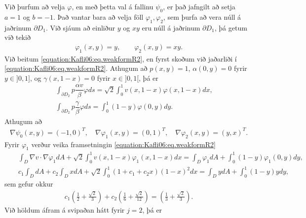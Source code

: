 \documentclass[a4paper,10pt,icelandic]{sphinxmanual}
\begin{document}
Við þurfum að velja \(\varphi\), en með þetta val á fallinu \(\psi_0\), er það jafngilt að setja \(a=1\) og \(b=-1\). Það vantar bara að velja föll \(\varphi_1, \varphi_2\), sem þurfa að vera núll á jaðrinum \(\partial D_1\).
Við sjáum að einliður \(y\) og \(x y\) eru núll á jaðrinum \(\partial D_1\), þá getum við tekið
\begin{equation*}
\begin{split}\varphi_1 (x,y)=y , \qquad \varphi_2(x,y)= x y.\end{split}
\end{equation*}
Við beitum \eqref{equation:Kafli06:eq.weakformR2}, en fyrst skoðum við jaðarliði í \eqref{equation:Kafli06:eq.weakformR2}.
Athugum að \(p(x,y)=1\),  \(\alpha(0,y)=0\) fyrir \(y\in ]0,1]\), og \(\gamma(x,1-x)=0\) fyrir \(x\in ]0,1[\), þá er
\begin{equation*}
\begin{split}&& \int_{\partial D_2} p \dfrac{\alpha v}{\beta} \varphi ds=
\sqrt 2 \int_0^1 v(x,1-x) \varphi(x,1-x)dx, \\
&& \int_{\partial D_2} p \dfrac{\gamma}{\beta} \varphi ds= \int_0^1 (1-y)\varphi(0,y)dy.\end{split}
\end{equation*}
Athugum að
\begin{equation*}
\begin{split}\nabla \psi_0(x,y)=(-1,0)^T, \quad \nabla \varphi_1(x,y)= (0,1)^T , \quad \nabla \varphi_2(x,y)=(y,x)^T.\end{split}
\end{equation*}
Fyrir \(\varphi_1\) verður veika framsetningin \eqref{equation:Kafli06:eq.weakformR2}
\begin{equation*}
\begin{split}&&\int_D \nabla v \cdot \nabla \varphi_1 dA + \sqrt 2 \int_0^1 v(x,1-x) \varphi_1(x,1-x)dx= \int_D \varphi_1 dA+ \int_0^1 (1-y)\varphi_1(0,y)dy,
\\
&& c_1 \int_D dA+ c_2 \int_D x dA +\sqrt 2 \int_0^1 \left(1+c_1+c_2 x\right)(1-x)^2dx =\int_D y dA + \int_0^1 (1-y)y dy,\end{split}
\end{equation*}
sem gefur okkur
\begin{equation*}
\begin{split}c_1(\tfrac 12 +\tfrac{\sqrt 2}{3})+c_2(\tfrac 16 +\tfrac{\sqrt 2}{12})=(\tfrac 13 +\tfrac{\sqrt 2}{3}).\end{split}
\end{equation*}
Við höldum áfram á svipaðan hátt fyrir \(j=2\), þá er
\end{document}
